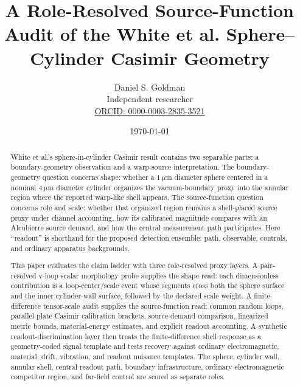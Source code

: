 \documentclass[11pt]{article}
\title{\bfseries A Role-Resolved Source-Function Audit of the White et al. Sphere--Cylinder Casimir Geometry}
\author{
Daniel S. Goldman\\
Independent researcher\\
\href{https://orcid.org/0000-0003-2835-3521}{ORCID: 0000-0003-2835-3521}
}
\date{\today}
\newcommand{\um}{\,\mu\mathrm{m}}
\begin{document}
\maketitle

\begin{abstract}
White et al.'s sphere-in-cylinder Casimir result contains two separable parts:
a boundary-geometry observation and a warp-source interpretation. The
boundary-geometry question concerns shape: whether a $1\um$ diameter sphere
centered in a nominal $4\um$ diameter cylinder organizes the vacuum-boundary
proxy into the annular region where the reported warp-like shell appears. The
source-function question concerns role and scale: whether that organized
region remains a shell-placed source proxy under channel accounting, how its
calibrated magnitude compares with an Alcubierre source demand, and how the
central measurement path participates. Here ``readout'' is shorthand for the
proposed detection ensemble: path, observable, controls, and ordinary
apparatus backgrounds.

This paper evaluates the claim ladder with three role-resolved proxy layers. A
pair-resolved v-loop scalar morphology probe supplies the shape read: each
dimensionless contribution is a loop-center/scale event whose segments cross
both the sphere surface and the inner cylinder-wall surface, followed by the
declared scale weight. A finite-difference tensor-scale audit supplies
the source-function read: common random loops, parallel-plate Casimir
calibration brackets, source-demand comparison, linearized metric bounds,
material-energy estimates, and explicit readout accounting. A synthetic
readout-discrimination layer then treats the finite-difference shell response
as a geometry-coded signal template and tests recovery against ordinary
electromagnetic, material, drift, vibration, and readout nuisance templates.
The sphere, cylinder wall, annular shell, central readout path, boundary
infrastructure, ordinary electromagnetic competitor region, and far-field
control are scored as separate roles.


\end{abstract}
\end{document}
